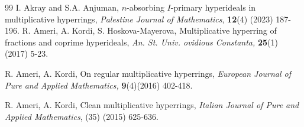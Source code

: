 \documentclass[preprint,review,10pt]{amsart}
\theoremstyle{definition}
\theoremstyle{remark}
\numberwithin{equation}{section}
\begin{document}
\begin{thebibliography}{99}
I. Akray and S.A. Anjuman, $n$-absorbing $I$-primary hyperideals in  multiplicative hyperrings, {\it Palestine Journal of Mathematics}, {\bf 12}(4) (2023) 187-196.
R. Ameri, A. Kordi, S. Hoskova-Mayerova, Multiplicative hyperring of fractions and coprime hyperideals, {\it An. St. Univ. ovidious Constanta,}  {\bf 25}(1) (2017)   5-23.




R. Ameri, A. Kordi, On regular multiplicative hyperrings, {\it European Journal of Pure and Applied  Mathematics,} {\bf 9}(4)(2016) 402-418.

R. Ameri, A. Kordi, Clean multiplicative hyperrings, {\it Italian Journal of Pure and Applied Mathematics}, (35) (2015) 625-636. 












\end{thebibliography}
\end{document}
